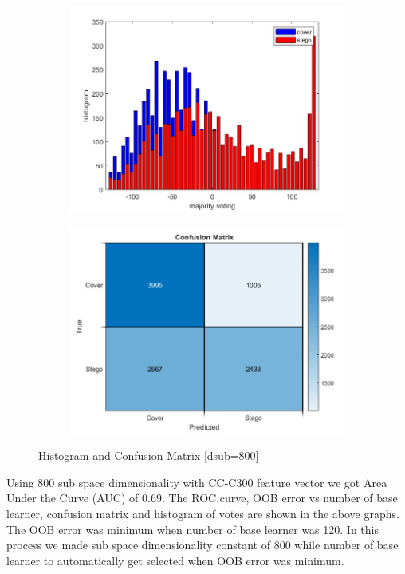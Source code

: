 \begin{figure}[H]
    \begin{subfigure}[b]{0.5\textwidth}
        \includegraphics[width=\textwidth]{img/800/histogramgray.jpg}
    \end{subfigure}
    \hfill
    \begin{subfigure}[b]{0.5\textwidth}
        \includegraphics[width=\textwidth]{img/800/confusegray.jpg}
    \end{subfigure}
    \caption{Histogram and Confusion Matrix [dsub=800]}
\end{figure}
\begin{flushleft}
Using 800 sub space dimensionality with CC-C300 feature vector we got Area Under the Curve (AUC) of 0.69. The ROC curve, OOB error vs number of base learner, confusion matrix and histogram of votes are shown in the above graphs. The OOB error was minimum when number of base learner was 120. In this process we made sub space dimensionality constant of 800 while number of base learner to automatically get selected when OOB error was minimum. 
\end{flushleft}

